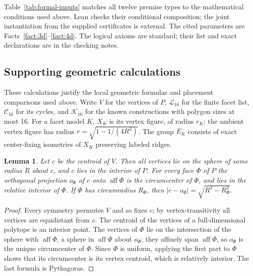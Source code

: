 \documentclass[11pt]{article}
\newtheorem{lemma}[theorem]{Lemma}
\theoremstyle{definition}
\theoremstyle{remark}
\newcommand{\aff}{\operatorname{aff}}
\begin{document}
Table~\ref{tab:formal-inputs} matches all twelve premise types to the mathematical conditions used above. Lean checks their conditional composition; the joint instantiation from the supplied certificates is external. The cited parameters are Facts~\ref{fact:3d}--\ref{fact:4d}. The logical axioms are standard; their list and exact declarations are in the checking notes.
\begin{appendices}
\section{Supporting geometric calculations}\label{app:geometry}
These calculations justify the local geometric formulas and placement comparisons used above. Write $V$ for the vertices of $P$, $\mathcal L_{16}$ for the finite facet list, $\mathcal C_{16}$ for its cycles, and $\mathcal K_{16}$ for the known constructions with polygon sizes at most 16. For a facet model $K$, $X_K$ is its vertex figure, of radius $r_K$; the ambient vertex figure has radius $r=\sqrt{1-1/(4R^2)}$. The group $E_K$ consists of exact center-fixing isometries of $X_K$ preserving labeled ridges.\par

\begin{lemma}\label{lem:sphere}
Let $c$ be the centroid of $V$. Then all vertices lie on the sphere of some
radius $R$ about $c$, and $c$ lies in the interior of $P$. For every face
$\Phi$ of $P$ the orthogonal projection $o_\Phi$ of $c$ onto $\aff\Phi$ is
the circumcenter of $\Phi$, and lies in the relative interior of $\Phi$.
If $\Phi$ has circumradius $R_\Phi$, then
$|c-o_\Phi|=\sqrt{R^2-R_\Phi^2}$.
\end{lemma}
\begin{proof}
Every symmetry permutes $V$ and so fixes $c$; by vertex-transitivity all
vertices are equidistant from $c$. The centroid of the vertices of a
full-dimensional polytope is an interior point. The vertices of $\Phi$ lie
on the intersection of the sphere with $\aff\Phi$, a sphere in $\aff\Phi$
about $o_\Phi$; they affinely span $\aff\Phi$, so $o_\Phi$ is the unique
circumcenter of $\Phi$. Since $\Phi$ is uniform, applying the first part to
$\Phi$ shows that its circumcenter is its vertex centroid, which is
relatively interior. The last formula is Pythagoras.
\end{proof}


\end{appendices}
\end{document}
